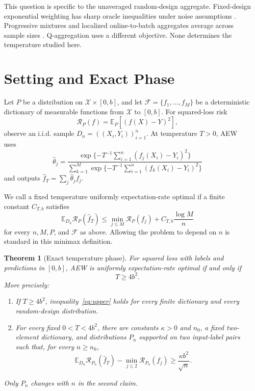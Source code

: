 \documentclass[twoside]{article}
\newtheorem{theorem}{Theorem}
\newcommand{\E}{\mathbb E}
\newcommand{\R}{\mathcal R}
\newcommand{\cF}{\mathcal F}
\newcommand{\1}{\mathbf 1}
\begin{document}
This question is specific to the unaveraged random-design aggregate. Fixed-design exponential weighting has sharp oracle inequalities under noise assumptions \citep{dalalyan2008aggregation}. Progressive mixtures and localized online-to-batch aggregates average across sample sizes \citep{mourtada2023local}. Q-aggregation uses a different objective. None determines the temperature studied here.

\section{Setting and Exact Phase}

Let $P$ be a distribution on $\mathcal X\times[0,b]$, and let $\cF=\{f_1,\ldots,f_M\}$ be a deterministic dictionary of measurable functions from $\mathcal X$ to $[0,b]$. For squared-loss risk \[ \R_P(f)=\E_P[(f(X)-Y)^2], \] observe an i.i.d. sample $D_n=((X_i,Y_i))_{i=1}^n$. At temperature $T>0$, AEW uses
\begin{equation}
\widehat\theta_j=
\frac{\exp\{-T^{-1}\sum_{i=1}^n(f_j(X_i)-Y_i)^2\}}
{\sum_{k=1}^M\exp\{-T^{-1}\sum_{i=1}^n(f_k(X_i)-Y_i)^2\}}
\label{eq:weights}
\end{equation}
and outputs $\widehat f_T=\sum_j\widehat\theta_jf_j$.

We call a fixed temperature uniformly expectation-rate optimal if a finite constant $C_{T,b}$ satisfies \[ \E_{D_n}\R_P(\widehat f_T) \leq \min_{j\leq M}\R_P(f_j)+C_{T,b}\frac{\log M}{n} \] for every $n,M,P$, and $\cF$ as above. Allowing the problem to depend on $n$ is standard in this minimax definition.

\begin{theorem}[Exact temperature phase]
\label{thm:phase}
For squared loss with labels and predictions in $[0,b]$, AEW is uniformly expectation-rate optimal if and only if \[ T\geq4b^2. \] More precisely:
\begin{enumerate}
\item If $T\geq4b^2$, inequality~\eqref{eq:upper} holds for every finite dictionary and every random-design distribution.
\item For every fixed $0<T<4b^2$, there are constants $\kappa>0$ and $n_0$, a fixed two-element dictionary, and distributions $P_n$ supported on two input-label pairs such that, for every $n\geq n_0$,
\begin{equation}
\E_{D_n}\R_{P_n}(\widehat f_T)
-\min_{j\leq2}\R_{P_n}(f_j)
\geq \frac{\kappa b^2}{\sqrt n}.
\label{eq:lower}
\end{equation}
\end{enumerate}
Only $P_n$ changes with $n$ in the second claim.
\end{theorem}
\end{document}

